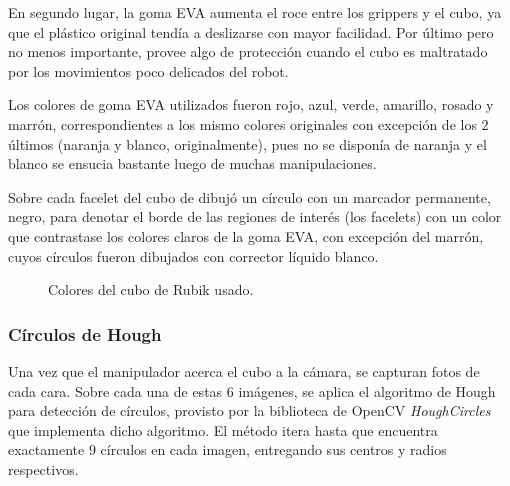 En segundo lugar, la goma EVA aumenta el roce entre los grippers y el cubo, ya que el plástico original tendía a deslizarse con mayor facilidad. Por último pero no menos importante, provee algo de protección cuando el cubo es maltratado por los movimientos poco delicados del robot.

Los colores de goma EVA utilizados fueron rojo, azul, verde, amarillo, rosado y marrón, correspondientes a los mismo colores originales con excepción de los $2$ últimos (naranja y blanco, originalmente), pues no se disponía de naranja y  el blanco se ensucia bastante luego de muchas manipulaciones.

Sobre cada facelet del cubo de dibujó un círculo con un marcador permanente, negro, para denotar el borde de las regiones de interés (los facelets) con un color que contrastase los colores claros de la goma EVA, con excepción del marrón, cuyos círculos fueron dibujados con corrector líquido blanco.

\begin{figure}[h!]
	\centering
	\caption{Colores del cubo de Rubik usado.}
	\label{colorescubo}
\end{figure}

\subsubsection{Círculos de Hough}
Una vez que el manipulador acerca el cubo a la cámara, se capturan fotos de cada cara. Sobre cada una de estas $6$ imágenes, se aplica el algoritmo de Hough para detección de círculos, provisto por la biblioteca de OpenCV \textit{HoughCircles} que implementa dicho algoritmo. El método itera hasta que encuentra exactamente $9$ círculos en cada imagen, entregando sus centros y radios respectivos.

